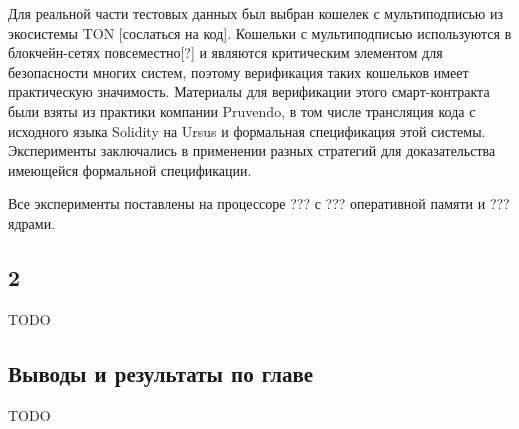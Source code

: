 \documentclass[../diploma.tex]{subfiles}
\begin{document}
Для реальной части тестовых данных был выбран кошелек с мультиподписью из экосистемы TON [сослаться на код]. Кошельки с мультиподписью используются в блокчейн-сетях повсеместно[?] и являются критическим элементом для безопасности многих систем, поэтому верификация таких кошельков имеет практическую значимость. Материалы для верификации этого смарт-контракта были взяты из практики компании Pruvendo, в том числе трансляция кода с исходного языка Solidity на Ursus и формальная спецификация этой системы. Эксперименты заключались в применении разных стратегий для доказательства имеющейся формальной спецификации.

Все эксперименты поставлены на процессоре ??? с ??? оперативной памяти и ??? ядрами.

\subsection{2}

TODO

\subsection{Выводы и результаты по главе}

TODO
\end{document}

